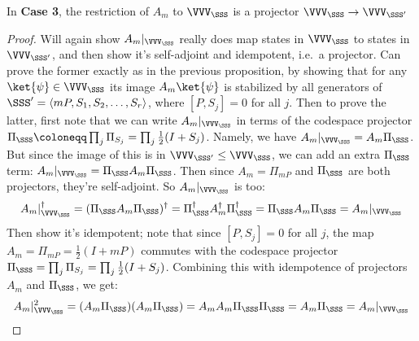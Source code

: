 \begin{proposition}
    In \textbf{Case 3}, the restriction of $A_m$ to $\VVV_\SSS$ is a projector $\VVV_\SSS \to \VVV_{\SSS'}$
    \begin{proof}
        Will again show $A_m|_{\VVV_\SSS}$ really does map states in $\VVV_\SSS$ to states in $\VVV_{\SSS'}$, and then show it's self-adjoint and idempotent, i.e.\ a projector.
        Can prove the former exactly as in the previous proposition, by showing that for any $\ket{\psi} \in \VVV_\SSS$ its image $A_m\ket{\psi}$ is stabilized by all generators of $\SSS' = \langle mP, S_1, S_2, \ldots, S_r \rangle$, where $[P, S_j] = 0$ for all $j$.
        Then to prove the latter, first note that we can write $A_m|_{\VVV_\SSS}$ in terms of the codespace projector $\Pi_\SSS \coloneqq \prod_{j} \Pi_{S_j} = \prod_{j} \frac{1}{2}(I + S_j)$.
        Namely, we have $A_m|_{\VVV_\SSS} = A_m \Pi_\SSS$.
        But since the image of this is in $\VVV_{\SSS'} \leq \VVV_\SSS$, we can add an extra $\Pi_\SSS$ term: $A_m|_{\VVV_\SSS} = \Pi_\SSS A_m \Pi_\SSS$.
        Then since $A_m = \Pi_{mP}$ and $\Pi_{\SSS}$ are both projectors, they're self-adjoint.
        So $A_m|_{\VVV_\SSS}$ is too:
        \begin{equation}\label{eq:A_m_restriction_self_adjoint}
            A_m|_{\VVV_\SSS}^\dagger
            = (\Pi_\SSS A_m \Pi_\SSS)^\dagger
            = \Pi_\SSS^\dagger A_m^\dagger \Pi_\SSS^\dagger
            = \Pi_\SSS A_m \Pi_\SSS
            = A_m|_{\VVV_\SSS}
        \end{equation}
        Then show it's idempotent; note that since $[P, S_j] = 0$ for all $j$, the map $A_m = \Pi_{mP} = \frac{1}{2}(I + mP)$ commutes with the codespace projector $\Pi_\SSS = \prod_{j} \Pi_{S_j} = \prod_{j} \frac{1}{2}(I + S_j)$.
        Combining this with idempotence of projectors $A_m$ and $\Pi_{\SSS}$, we get:
        \begin{equation}\label{eq:A_m_restriction_idempotent}
            A_m|_{\VVV_\SSS}^2
            = (A_m \Pi_\SSS)(A_m \Pi_\SSS)
            = A_m A_m \Pi_\SSS \Pi_\SSS
            = A_m \Pi_\SSS
            = A_m|_{\VVV_\SSS}
        \end{equation}
    \end{proof}
\end{proposition}

